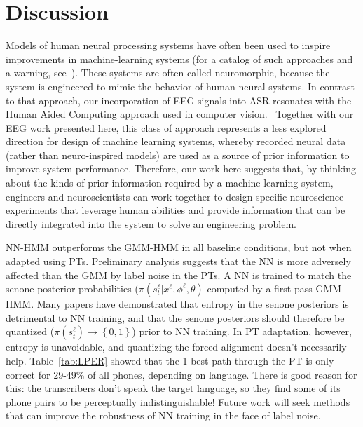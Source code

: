 \section{Discussion}

Models of human neural processing systems have often been used to
inspire improvements in machine-learning systems (for a catalog 
of such approaches and a warning, see~\cite{Bourlard96}).  These
systems are often called neuromorphic, because the system is engineered
to mimic the behavior of human neural systems. In contrast to that
approach, our incorporation of EEG signals into ASR resonates with
the Human Aided Computing approach used in computer
vision.~\cite{Shenoy08,Wang09} Together with our EEG work presented here,
this class of approach represents a less explored direction for design
of machine learning systems, whereby recorded neural data (rather than
neuro-inspired models) are used as a source of prior information to
improve system performance. Therefore, our work here suggests that, by
thinking about the kinds of prior information required by a machine
learning system, engineers and neuroscientists can work together to
design specific neuroscience experiments that leverage human abilities
and provide information that can be directly integrated into the system
to solve an engineering problem.

NN-HMM outperforms the GMM-HMM in all baseline conditions, but not
when adapted using PTs.  Preliminary analysis suggests that the NN is
more adversely affected than the GMM by label noise in the PTs.  A NN
is trained to match the senone posterior probabilities
($\pi(s_t^\ell|x^\ell,\phi^\ell,\theta)$ computed by a first-pass
GMM-HMM.  Many papers have demonstrated that entropy in the senone
posteriors is detrimental to NN training, and that the senone
posteriors should therefore be quantized
($\pi(s_t^\ell)\rightarrow\left\{0,1\right\}$) prior to NN training.
In PT adaptation, however, entropy is unavoidable, and quantizing the
forced alignment doesn't necessarily help.  Table~\ref{tab:LPER}
showed that the 1-best path through the PT is only correct for 29-49\%
of all phones, depending on language.  There is good reason for this:
the transcribers don't speak the target language, so they find some of
its phone pairs to be perceptually indistinguishable!  Future work
will seek methods that can improve the robustness of NN training in
the face of label noise.  

